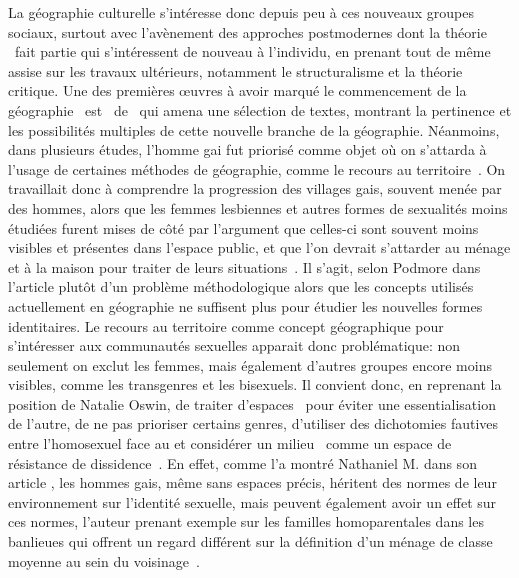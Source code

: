 La géographie culturelle s'intéresse donc depuis peu à ces nouveaux groupes sociaux, surtout avec l'avènement des approches postmodernes dont la théorie \qu\ fait partie qui s'intéressent de nouveau à l'individu, en prenant tout de même assise sur les travaux ultérieurs, notamment le structuralisme et la théorie critique. 
Une des premières œuvres à avoir marqué le commencement de la géographie \qu\ est~ de~\citet{Bell1994} qui amena une sélection de textes, montrant la pertinence et les possibilités multiples de cette nouvelle branche de la géographie. 
Néanmoins, dans plusieurs études, l'homme gai fut priorisé comme objet où on s'attarda à l'usage de certaines méthodes de géographie, comme le recours au territoire~\citep{Podmore2001,Oswin2008}. 
On travaillait donc à comprendre la progression des villages gais, souvent menée par des hommes, alors que les femmes lesbiennes et autres formes de sexualités moins étudiées furent mises de côté par l'argument que celles-ci sont souvent moins visibles et présentes dans l'espace public, et que l'on devrait s'attarder au ménage et à la maison pour traiter de leurs situations~\citep[333-334]{Podmore2001}. 
Il s'agit, selon Podmore dans l'article  plutôt d'un problème méthodologique alors que les concepts utilisés actuellement en géographie ne suffisent plus pour étudier les nouvelles formes identitaires. 
Le recours au territoire comme concept géographique pour s'intéresser aux communautés sexuelles apparait donc problématique: non seulement on exclut les femmes, mais également d'autres groupes encore moins visibles, comme les transgenres et les bisexuels. 
Il convient donc, en reprenant la position de Natalie Oswin, de traiter d'espaces \qus\ pour éviter une essentialisation de l'autre, de ne pas prioriser certains genres, d'utiliser des dichotomies fautives entre l'homosexuel face au  et considérer  un milieu \qu\ comme un espace de résistance de dissidence~\citep{Oswin2008}. 
En effet, comme l'a montré Nathaniel M. \citet{Lewis2011} dans son article , les hommes gais, même sans espaces précis, héritent des normes de leur environnement sur l'identité sexuelle, mais peuvent également avoir un effet sur ces normes, l'auteur prenant exemple sur les familles homoparentales dans les banlieues qui offrent un regard différent sur la définition d'un ménage de classe moyenne au sein du voisinage~\citep[304]{Lewis2011}.


